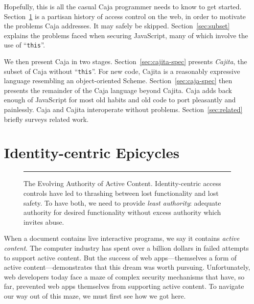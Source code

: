 \documentclass[letterpaper,twocolumn,10pt]{article}
\newcommand{\code}[1]{{\tt {#1}}}              %
\begin{document}
Hopefully, this is all the casual Caja programmer needs to know to get 
started. Section~\ref{sec:epicycles} is a partisan history of access control 
on the web, in order to motivate the problems Caja addresses. It may safely 
be skipped. Section~\ref{sec:subset} explains the problems faced when 
securing JavaScript, many of which involve the use of ``\code{this}''.

We then present Caja in two stages. Section~\ref{sec:cajita-spec} presents 
\emph{Cajita}, the subset of Caja without ``\code{this}''. For new code, 
Cajita is a reasonably expressive language resembling an object-oriented 
Scheme. Section~\ref{sec:caja-spec} then presents the remainder of the Caja 
language beyond Cajita. Caja adds back enough of JavaScript for most old 
habits and old code to port pleasantly and painlessly. Caja and Cajita 
interoperate without problems. Section~\ref{sec:related} briefly 
surveys related work.



\section{Identity-centric Epicycles}
\label{sec:epicycles}

\begin{figure}[t!]
  
\caption[The Evolving Authority of Active Content]{The Evolving Authority of 
Active Content. Identity-centric access controls have led to thrashing 
between lost functionality and lost safety. To have both, we need to provide 
\emph{least authority}: adequate authority for desired functionality without 
excess authority which invites abuse. \\ } \hrule
  \label{fig:evo-auth}
\end{figure}

When a document contains live interactive programs, we say it contains 
\emph{active content}. The computer industry has spent over a billion dollars 
in failed attempts to support active content. But the success of web 
apps---themselves a form of active content---demonstrates that this dream was 
worth pursuing. Unfortunately, web developers today face a maze of complex 
security mechanisms that have, so far, prevented web apps themselves from 
supporting active content. To navigate our way out of this maze, we must 
first see how we got here.
\end{document}
